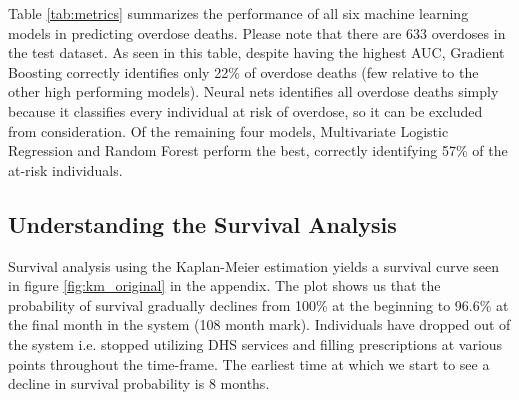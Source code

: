 \documentclass[twoside,10.5pt]{article}
\begin{document}
\begin{table}[h!]
  \begin{center}
    \caption{Evaluation Metrics of the Machine Learning Models}
    \label{tab:metrics}
  \end{center}
\end{table}

Table \ref{tab:metrics} summarizes the performance of all six machine learning models in predicting overdose deaths. Please note that there are 633 overdoses in the test dataset. As seen in this table, despite having the highest AUC, Gradient Boosting correctly identifies only 22\% of overdose deaths (few relative to the other high performing models). Neural nets identifies all overdose deaths simply because it classifies every individual at risk of overdose, so it can be excluded from consideration. Of the remaining four models, Multivariate Logistic Regression and Random Forest perform the best, correctly identifying 57\% of the at-risk individuals. 

\subsection{Understanding the Survival Analysis}
Survival analysis using the Kaplan-Meier estimation yields a survival curve seen in figure \ref{fig:km_original} in the appendix. The plot shows us that the probability of survival gradually declines from 100\% at the beginning to 96.6\% at the final month in the system (108 month mark). Individuals have dropped out of the system i.e. stopped utilizing DHS services and filling prescriptions at various points throughout the time-frame. The earliest time at which we start to see a decline in survival probability is 8 months.\\
\end{document}
